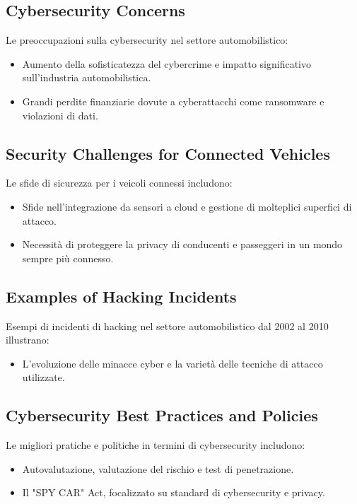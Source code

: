 \subsection{Cybersecurity Concerns} Le preoccupazioni sulla cybersecurity nel
settore automobilistico: \begin{itemize} \item Aumento della sofisticatezza del
cybercrime e impatto significativo sull'industria automobilistica. \item Grandi
perdite finanziarie dovute a cyberattacchi come ransomware e violazioni di dati.
\end{itemize}

\subsection{Security Challenges for Connected Vehicles} Le sfide di sicurezza
per i veicoli connessi includono: \begin{itemize} \item Sfide nell'integrazione
da sensori a cloud e gestione di molteplici superfici di attacco. \item
Necessità di proteggere la privacy di conducenti e passeggeri in un mondo sempre
più connesso. \end{itemize}

\subsection{Examples of Hacking Incidents} Esempi di incidenti di hacking nel
settore automobilistico dal 2002 al 2010 illustrano: \begin{itemize} \item
L'evoluzione delle minacce cyber e la varietà delle tecniche di attacco
utilizzate. \end{itemize}

\subsection{Cybersecurity Best Practices and Policies} Le migliori pratiche e
politiche in termini di cybersecurity includono: \begin{itemize} \item
Autovalutazione, valutazione del rischio e test di penetrazione. \item Il "SPY
CAR" Act, focalizzato su standard di cybersecurity e privacy. \end{itemize}


